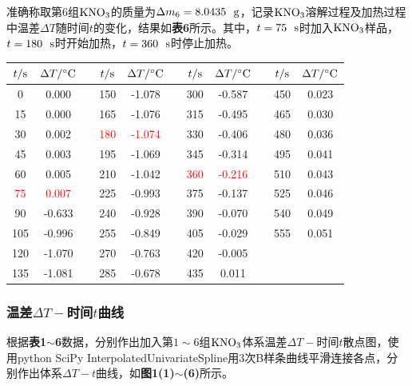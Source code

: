 \documentclass[12pt]{article}
\begin{document}
准确称取第6组$\rm KNO_{3}$的质量为$\Delta m_{6}=8.0435\ \ {\rm g}$，记录$\rm KNO_{3}$溶解过程及加热过程中温差$\Delta T$随时间$t$的变化，结果如\textbf{表6}所示。其中，$t=75\ \ {\rm s}$时加入$\rm KNO_{3}$样品，$t=180\ \ {\rm s}$时开始加热，$t=360\ \ {\rm s}$时停止加热。
\begin{table}[h]
	\centering
	\begin{tabular}{ccccccccccc}
		\toprule
		$t/{\rm s}$ & $\Delta T/{\rm ^{\circ}C}$ & & $t/{\rm s}$ & $\Delta T/{\rm ^{\circ}C}$& & 	$t/{\rm s}$ & $\Delta T/{\rm ^{\circ}C}$ & & $t/{\rm s}$ & $\Delta T/{\rm ^{\circ}C}$ \\
		\midrule
		0   & 0.000  &  & 150 & -1.078 &  & 300 & -0.587 &  & 450 & 0.023 \\
		15  & 0.000  &  & 165 & -1.076 &  & 315 & -0.495 &  & 465 & 0.030 \\
		30  & 0.002  &  & \textcolor{red}{180} & \textcolor{red}{-1.074} &  & 330 & -0.406 &  & 480 & 0.036 \\
		45  & 0.003  &  & 195 & -1.069 &  & 345 & -0.314 &  & 495 & 0.041 \\
		60  & 0.005  &  & 210 & -1.042 &  & \textcolor{red}{360} & \textcolor{red}{-0.216} &  & 510 & 0.043 \\
		\textcolor{red}{75}  & \textcolor{red}{0.007}  &  & 225 & -0.993 &  & 375 & -0.137 &  & 525 & 0.046 \\
		90  & -0.633 &  & 240 & -0.928 &  & 390 & -0.070 &  & 540 & 0.049 \\
		105 & -0.996 &  & 255 & -0.849 &  & 405 & -0.029 &  & 555 & 0.051 \\
		120 & -1.070 &  & 270 & -0.763 &  & 420 & -0.005 &  &     &       \\
		135 & -1.081 &  & 285 & -0.678 &  & 435 & 0.011  &  &     &       \\
		\bottomrule
	\end{tabular}
\end{table}
\par


\subsubsection{温差$\Delta T-$时间$t$曲线}
根据\textbf{表1$\sim$6}数据，分别作出加入第$1\sim 6$组$\rm KNO_{3}$体系温差$\Delta T-$时间$t$散点图，使用python SciPy InterpolatedUnivariateSpline用3次B样条曲线平滑连接各点，分别作出体系$\Delta T-t$曲线，如\textbf{图1(1)$\sim$(6)}所示。\par 
\end{document}
